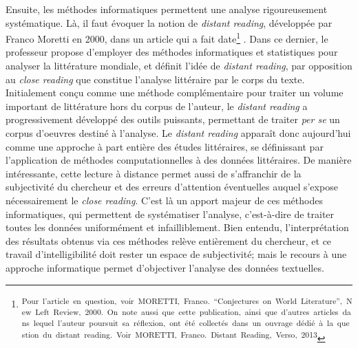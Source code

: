 \documentclass[letterpaper,portrait,12pt]{article}
\begin{document}
	Ensuite, les m\'{e}thodes informatiques permettent une analyse rigoureusement syst\'{e}matique. L\`{a}, il faut \'{e}voquer la notion de \emph{distant reading}, d\'{e}velopp\'{e}e par Franco Moretti en 2000, dans un article qui a fait date\footnote{\textsuperscript{\newpage
}\textsuperscript{	Pour\ l'article\ en\ question,\ voir\ MORETTI,\ Franco.\ {``}Conjectures\ on\ World\ Literature'',\ New\ Left\ Review,\ 2000.\ On\ note\ aussi\ que\ cette\ publication,\ ainsi\ que\ d'autres\ articles\ dans\ lequel\ l'auteur\ poursuit\ sa\ r\'{e}flexion,\ ont\ \'{e}t\'{e}\ collect\'{e}s\ dans\ un\ ouvrage\ d\'{e}di\'{e}\ \`{a}\ la\ question\ du\ distant\ reading.\ Voir\ MORETTI,\ Franco.\ Distant\ Reading,\ Verso,\ 2013}} . Dans ce dernier, le professeur propose d'employer des m\'{e}thodes informatiques et statistiques pour analyser la litt\'{e}rature mondiale, et d\'{e}finit l'id\'{e}e de \emph{distant reading}, par opposition au \emph{close reading} que constitue l'analyse litt\'{e}raire par le corps du texte. Initialement con\c{c}u comme une m\'{e}thode compl\'{e}mentaire pour traiter un volume important de litt\'{e}rature hors du corpus de l'auteur, le \emph{distant reading} a progressivement d\'{e}velopp\'{e} des outils puissants, permettant de traiter \emph{per se} un corpus d'oeuvres destin\'{e} \`{a} l'analyse. Le \emph{distant reading} appara\^{i}t donc aujourd'hui comme une approche \`{a} part enti\`{e}re des \'{e}tudes litt\'{e}raires, se d\'{e}finissant par l'application de m\'{e}thodes computationnelles \`{a} des donn\'{e}es litt\'{e}raires. De mani\`{e}re int\'{e}ressante, cette lecture \`{a} distance permet aussi de s'affranchir de la subjectivit\'{e} du chercheur et des erreurs d'attention \'{e}ventuelles auquel s'expose n\'{e}cessairement le \emph{close reading}. C'est l\`{a} un apport majeur de ces m\'{e}thodes informatiques, qui permettent de syst\'{e}matiser l'analyse, c'est-\`{a}-dire de traiter toutes les donn\'{e}es uniform\'{e}ment et infailliblement. Bien entendu, l'interpr\'{e}tation des r\'{e}sultats obtenus via ces m\'{e}thodes rel\`{e}ve enti\`{e}rement du chercheur, et ce travail d'intelligibilit\'{e} doit rester un espace de subjectivit\'{e}; mais le recours \`{a} une approche informatique permet d'objectiver l'analyse des donn\'{e}es textuelles.
\end{document}
